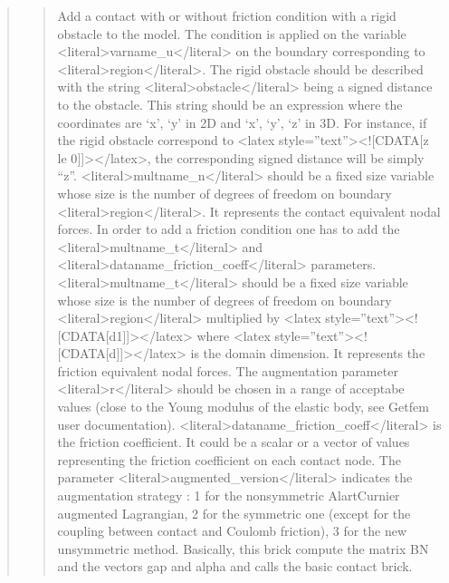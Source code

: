 \documentclass[a4paper,11pt,english]{sphinxmanual}
\begin{document}
\begin{quote}
\begin{quote}
\sphinxAtStartPar
Add a contact with or without friction condition with a rigid obstacle
to the model. The condition is applied on the variable \textless{}literal\textgreater{}varname\_u\textless{}/literal\textgreater{}
on the boundary corresponding to \textless{}literal\textgreater{}region\textless{}/literal\textgreater{}. The rigid obstacle should
be described with the string \textless{}literal\textgreater{}obstacle\textless{}/literal\textgreater{} being a signed distance to
the obstacle. This string should be an expression where the coordinates
are ‘x’, ‘y’ in 2D and ‘x’, ‘y’, ‘z’ in 3D. For instance, if the rigid
obstacle correspond to \textless{}latex style=”text”\textgreater{}\textless{}!{[}CDATA{[}z le 0{]}{]}\textgreater{}\textless{}/latex\textgreater{}, the corresponding signed distance
will be simply “z”. \textless{}literal\textgreater{}multname\_n\textless{}/literal\textgreater{} should be a fixed size variable whose size
is the number of degrees of freedom on boundary \textless{}literal\textgreater{}region\textless{}/literal\textgreater{}. It represents the
contact equivalent nodal forces. In order to add a friction condition
one has to add the \textless{}literal\textgreater{}multname\_t\textless{}/literal\textgreater{} and \textless{}literal\textgreater{}dataname\_friction\_coeff\textless{}/literal\textgreater{} parameters.
\textless{}literal\textgreater{}multname\_t\textless{}/literal\textgreater{} should be a fixed size variable whose size is
the number of degrees of freedom on boundary \textless{}literal\textgreater{}region\textless{}/literal\textgreater{} multiplied by
\textless{}latex style=”text”\textgreater{}\textless{}!{[}CDATA{[}d\sphinxhyphen{}1{]}{]}\textgreater{}\textless{}/latex\textgreater{} where \textless{}latex style=”text”\textgreater{}\textless{}!{[}CDATA{[}d{]}{]}\textgreater{}\textless{}/latex\textgreater{} is the domain dimension. It represents
the friction equivalent nodal forces.
The augmentation parameter \textless{}literal\textgreater{}r\textless{}/literal\textgreater{} should be chosen in a
range of acceptabe values (close to the Young modulus of the elastic
body, see Getfem user documentation).  \textless{}literal\textgreater{}dataname\_friction\_coeff\textless{}/literal\textgreater{} is
the friction coefficient. It could be a scalar or a vector of values
representing the friction coefficient on each contact node.
The parameter \textless{}literal\textgreater{}augmented\_version\textless{}/literal\textgreater{}
indicates the augmentation strategy : 1 for the non\sphinxhyphen{}symmetric
Alart\sphinxhyphen{}Curnier augmented Lagrangian, 2 for the symmetric one (except for
the coupling between contact and Coulomb friction),
3 for the new unsymmetric method.
Basically, this brick compute the matrix BN
and the vectors gap and alpha and calls the basic contact brick.
\end{quote}


\end{quote}
\end{document}
